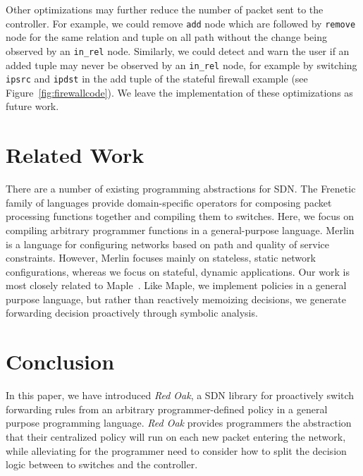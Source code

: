 \documentclass[preprint]{sigplanconf}
\begin{document}
Other optimizations may further reduce the number of packet sent to the controller. For example, we could remove \lstinline|add| node which are followed by \lstinline|remove| node for the same relation and tuple on all path without the change being observed by an \lstinline|in_rel| node. Similarly, we could detect and warn the user if an added tuple may never be observed by an \lstinline|in_rel| node, for example by switching \lstinline|ipsrc| and \lstinline|ipdst| in the add tuple of the stateful firewall example (see Figure~\ref{fig:firewallcode}). We leave the implementation of these optimizations as future work.




\section*{Related Work}
There are a number of existing programming abstractions for SDN. The Frenetic~\citep{Frenetic} family of languages provide domain-specific operators for composing packet processing functions together and compiling them to switches. Here, we focus on compiling arbitrary programmer functions in a general-purpose language. Merlin~\cite{Merlin} is a language for configuring networks based on path and quality of service constraints. However, Merlin focuses mainly on stateless, static network configurations, whereas we focus on stateful, dynamic applications. Our work is most closely related to Maple~\citep{Maple}. Like Maple, we implement policies in a general purpose language, but rather than reactively memoizing decisions, we generate forwarding decision proactively through symbolic analysis.


\section*{Conclusion}
In this paper, we have introduced \textit{Red Oak}, a SDN library for proactively switch forwarding rules
from an arbitrary programmer-defined policy in a general purpose programming language.
\textit{Red Oak} provides programmers the abstraction that their centralized policy will run on each 
new packet entering the network, while alleviating for the programmer need to consider
how to split the decision logic between to switches and the controller.
\end{document}
